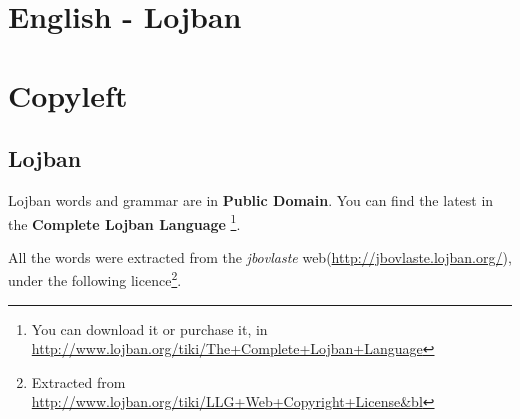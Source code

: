 \documentclass[ipa,twoside]{report}
\begin{document}
\label{cha:lojen}
\begin{multicols}{2}

  
\end{multicols}

\newpage 
\setlength{\leftfield}{0.22\textwidth}
\setlength{\rightfield}{0.22\textwidth}

\thispagestyle{plain}

\chapter*{English - Lojban}

\label{cha:enloj}
\begin{multicols}{2}


\end{multicols}

\chapter*{Copyleft}

\pagestyle{plain}

\section*{Lojban}

Lojban words and grammar are in \textbf{Public Domain}. You can find the latest in the \textbf{Complete Lojban Language}%
\footnote{You can download it or purchase it, in \url{http://www.lojban.org/tiki/The+Complete+Lojban+Language}}.

All the words were extracted from the \textsl{jbovlaste} web(\url{http://jbovlaste.lojban.org/}), under the following licence\footnote{Extracted from \url{http://www.lojban.org/tiki/LLG+Web+Copyright+License&bl}}.
\end{document}
